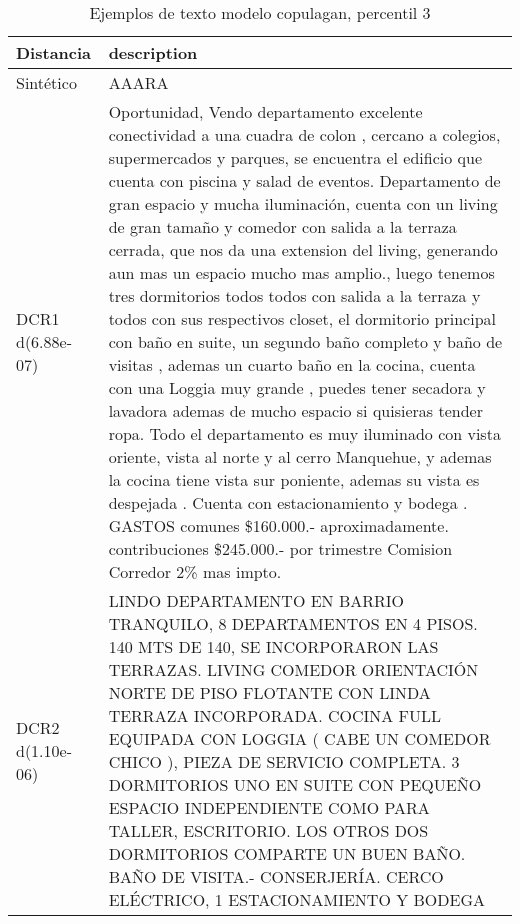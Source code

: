 \begin{table}[H]
\centering
\fontsize{10}{14}\selectfont
\caption{Ejemplos de texto modelo copulagan, percentil 3}
\label{table-example-economicos-a-3-copulagan-3p-text}
\begin{tabular}{|l|m{35em}|}
\hline
\rowcolor[gray]{0.8}
Distancia & description \\
\hline Sintético & AAARA \\
\hline DCR1 d(6.88e-07) & Oportunidad, Vendo departamento excelente conectividad a una cuadra de colon , cercano a colegios, supermercados y parques, se encuentra el edificio que cuenta con piscina y salad de eventos.
Departamento de gran espacio y mucha iluminaci\'on, cuenta con un living de gran tama\~no y comedor con salida a la terraza cerrada, que nos da una extension del living, generando aun mas un espacio mucho mas amplio., luego tenemos tres dormitorios todos todos con salida a la terraza y todos con sus respectivos closet, el dormitorio principal con ba\~no en suite, un segundo ba\~no completo y ba\~no de visitas , ademas un cuarto ba\~no en la cocina, cuenta con una Loggia muy grande , puedes tener secadora y lavadora ademas de mucho espacio si quisieras tender ropa.
Todo el departamento es muy iluminado con vista oriente, vista al norte y al cerro Manquehue, y ademas la cocina tiene vista sur poniente, ademas su vista es despejada .
Cuenta con estacionamiento y bodega .
GASTOS comunes \$160.000.- aproximadamente.
contribuciones \$245.000.- por trimestre 
Comision Corredor 2\% mas impto. \\
\hline DCR2 d(1.10e-06) & LINDO DEPARTAMENTO EN BARRIO TRANQUILO, 8 DEPARTAMENTOS EN 4 PISOS. 140 MTS DE 140, SE INCORPORARON LAS TERRAZAS. LIVING COMEDOR ORIENTACI\'ON NORTE DE PISO FLOTANTE CON LINDA TERRAZA INCORPORADA. COCINA FULL EQUIPADA CON LOGGIA ( CABE UN COMEDOR CHICO ), PIEZA DE SERVICIO COMPLETA. 3 DORMITORIOS UNO EN SUITE CON PEQUE\~NO ESPACIO INDEPENDIENTE COMO PARA TALLER, ESCRITORIO. LOS OTROS DOS DORMITORIOS COMPARTE UN BUEN BA\~NO. BA\~NO DE VISITA.- CONSERJER\'IA. CERCO EL\'ECTRICO, 1 ESTACIONAMIENTO Y BODEGA \\
\hline
\end{tabular}
\end{table}
